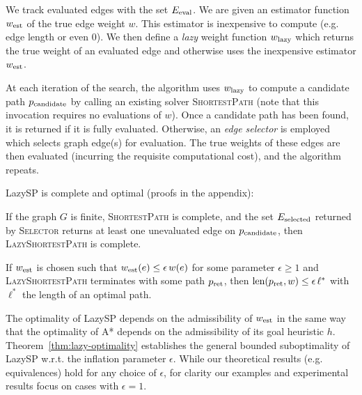 We track evaluated edges with the set $E_{\mbox{\scriptsize eval}}$.
We are given an estimator function $w_{\mbox{\scriptsize est}}$ of the true edge weight $w$.
This estimator is inexpensive to compute
(e.g. edge length or even $0$).
We then define a \emph{lazy} weight function $w_{\mbox{\scriptsize lazy}}$
which returns the
true weight of an evaluated edge and otherwise
uses the inexpensive estimator $w_{\mbox{\scriptsize est}}$.

At each iteration of the search,
the algorithm uses $w_{\mbox{\scriptsize lazy}}$ to compute a candidate path
$p_{\mbox{\scriptsize candidate}}$
by calling an existing solver \textsc{ShortestPath}
(note that this invocation requires no evaluations of $w$).
Once a candidate path has been found,
it is returned if it is fully evaluated.
Otherwise,
an \emph{edge selector} is employed which selects
graph edge(s) for evaluation.
The true weights of these edges are then evaluated
(incurring the requisite computational cost),
and the algorithm repeats.


LazySP is complete and optimal
(proofs in the appendix):

\begin{theorem}
If the graph $G$ is finite,
\textsc{ShortestPath} is complete,
and the set $E_{\mbox{\scriptsize selected}}$
returned by \textsc{Selector}
returns at least one unevaluated edge on $p_{\mbox{\scriptsize candidate}}$,
then \textsc{LazyShortestPath} is complete.
\label{thm:lazy-completeness}
\end{theorem}

\begin{theorem}
If $w_{\mbox{\scriptsize est}}$ is chosen such that
$w_{\mbox{\scriptsize est}}(e) \leq \epsilon \, w(e)$ for some parameter
$\epsilon \geq 1$ and
\textsc{LazyShortestPath} terminates
with some path $p_{\mbox{\scriptsize ret}}$,
then $\mbox{len}(p_{\mbox{\scriptsize ret}}, w) \leq \epsilon \, \ell^*$
with $\ell^*$ the length of an optimal path.
\label{thm:lazy-optimality}
\end{theorem}

The optimality of LazySP depends on the admissibility of
$w_{\mbox{\scriptsize est}}$
in the same way that the optimality of A* depends on
the admissibility of its goal heuristic $h$.
Theorem~\ref{thm:lazy-optimality} establishes the general
bounded suboptimality of LazySP
w.r.t. the inflation parameter $\epsilon$.
While our theoretical results (e.g. equivalences)
hold for any choice of $\epsilon$,
for clarity our examples and experimental results
focus on cases with $\epsilon = 1$.

